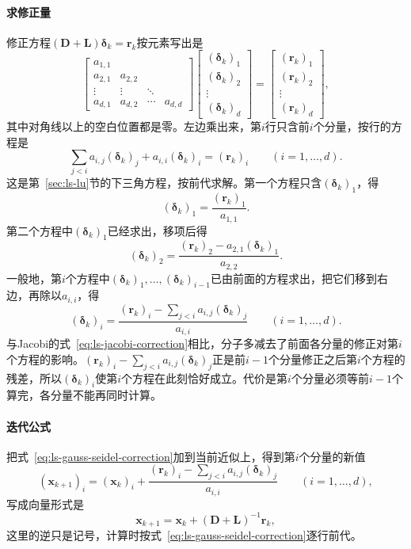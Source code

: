 \paragraph{求修正量}
修正方程$(\bm D+\bm L)\bm\delta_k=\bm r_k$按元素写出是
\[
 \begin{bmatrix}a_{1,1}&&&\\a_{2,1}&a_{2,2}&&\\\vdots&\vdots&\ddots&\\a_{d,1}&a_{d,2}&\cdots&a_{d,d}\end{bmatrix}
 \begin{bmatrix}(\bm\delta_k)_1\\(\bm\delta_k)_2\\\vdots\\(\bm\delta_k)_d\end{bmatrix}
 =\begin{bmatrix}(\bm r_k)_1\\(\bm r_k)_2\\\vdots\\(\bm r_k)_d\end{bmatrix},
\]
其中对角线以上的空白位置都是零。左边乘出来，第$i$行只含前$i$个分量，按行的方程是
\[
 \sum_{j<i}a_{i,j}(\bm\delta_k)_j+a_{i,i}(\bm\delta_k)_i=(\bm r_k)_i\qquad(i=1,\ldots,d).
\]
这是第~\ref{sec:ls-lu}节的下三角方程，按前代求解。第一个方程只含$(\bm\delta_k)_1$，得
\[
 (\bm\delta_k)_1=\frac{(\bm r_k)_1}{a_{1,1}} .
\]
第二个方程中$(\bm\delta_k)_1$已经求出，移项后得
\[
 (\bm\delta_k)_2=\frac{(\bm r_k)_2-a_{2,1}(\bm\delta_k)_1}{a_{2,2}} .
\]
一般地，第$i$个方程中$(\bm\delta_k)_1,\ldots,(\bm\delta_k)_{i-1}$已由前面的方程求出，把它们移到右边，再除以$a_{i,i}$，得
\begin{equation}
 (\bm\delta_k)_i=\frac{(\bm r_k)_i-\sum_{j<i}a_{i,j}(\bm\delta_k)_j}{a_{i,i}}\qquad(i=1,\ldots,d).
 \label{eq:ls-gauss-seidel-correction}
\end{equation}
与Jacobi的式~\eqref{eq:ls-jacobi-correction}相比，分子多减去了前面各分量的修正对第$i$个方程的影响。$(\bm r_k)_i-\sum_{j<i}a_{i,j}(\bm\delta_k)_j$正是前$i-1$个分量修正之后第$i$个方程的残差，所以$(\bm\delta_k)_i$使第$i$个方程在此刻恰好成立。代价是第$i$个分量必须等前$i-1$个算完，各分量不能再同时计算。

\paragraph{迭代公式}
把式~\eqref{eq:ls-gauss-seidel-correction}加到当前近似上，得到第$i$个分量的新值
\begin{equation}
 (\bm x_{k+1})_i=(\bm x_k)_i+\frac{(\bm r_k)_i-\sum_{j<i}a_{i,j}(\bm\delta_k)_j}{a_{i,i}}\qquad(i=1,\ldots,d),
 \label{eq:ls-gauss-seidel-update}
\end{equation}
写成向量形式是
\[
 \bm x_{k+1}=\bm x_k+(\bm D+\bm L)^{-1}\bm r_k ,
\]
这里的逆只是记号，计算时按式~\eqref{eq:ls-gauss-seidel-correction}逐行前代。

